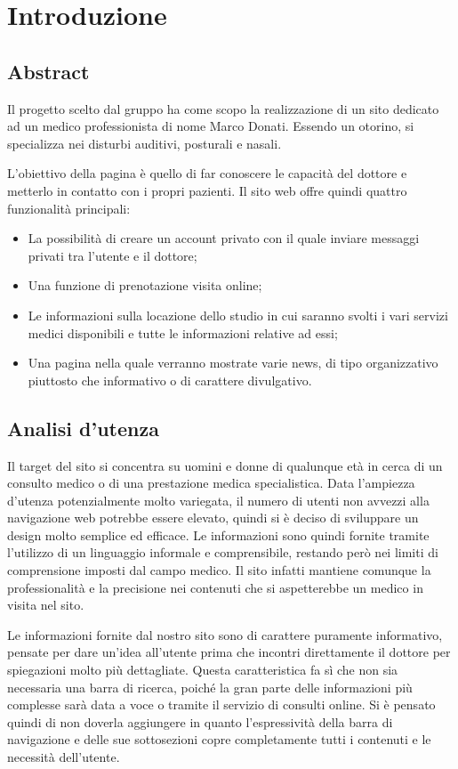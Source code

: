 \section{Introduzione}
\label{introduzione}

\subsection{Abstract}
Il progetto scelto dal gruppo ha come scopo la realizzazione di un sito dedicato ad un medico professionista di nome Marco Donati. Essendo un otorino, si specializza nei disturbi auditivi, posturali e nasali.

L’obiettivo della pagina è quello di far conoscere le capacità del dottore e metterlo in contatto con i propri pazienti.
Il sito web offre quindi quattro funzionalità principali:
\begin{itemize}
\item La possibilità di creare un account privato con il quale inviare messaggi privati tra l’utente e il dottore;
\item Una funzione di prenotazione visita online;
\item Le informazioni sulla locazione dello studio in cui saranno svolti i vari servizi medici disponibili e tutte le informazioni relative ad essi;
\item Una pagina nella quale verranno mostrate varie news, di tipo organizzativo piuttosto che informativo o di carattere divulgativo.
\end{itemize}

\subsection{Analisi d'utenza}
Il target del sito si concentra su uomini e donne di qualunque età in cerca di un consulto medico o di una prestazione medica specialistica.
Data l’ampiezza d’utenza potenzialmente molto variegata, il numero di utenti non avvezzi alla navigazione web potrebbe essere elevato, quindi si è deciso di sviluppare un design molto semplice ed efficace.
Le informazioni sono quindi fornite tramite l’utilizzo di un linguaggio informale e comprensibile, restando però nei limiti di comprensione imposti dal campo medico.
Il sito infatti mantiene comunque la professionalità e la precisione nei contenuti che si aspetterebbe un medico in visita nel sito.

Le informazioni fornite dal nostro sito sono di carattere puramente informativo, pensate per dare un’idea all’utente prima che incontri direttamente il dottore per spiegazioni molto più dettagliate.
Questa caratteristica fa sì che non sia necessaria una barra di ricerca, poiché la gran parte delle informazioni più complesse sarà data a voce o tramite il servizio di consulti online.
Si è pensato quindi di non doverla aggiungere in quanto l’espressività della barra di navigazione e delle sue sottosezioni copre completamente tutti i contenuti e le necessità dell’utente.

